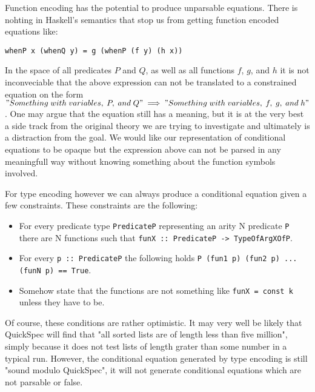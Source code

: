 Function encoding has the potential to produce unparsable equations.
There is nohting in Haskell's semantics that stop us from getting function
encoded equations like:
\begin{verbatim}whenP x (whenQ y) = g (whenP (f y) (h x))\end{verbatim}
In the space of all predicates $P$ and $Q$, as well as all functions $f$, $g$, and $h$ it
is not inconveciable that the above expression can not be translated to a constrained
equation on the form\\$"Something\;with\;variables,\;P,\;and\;Q"\implies "Something\;with\;variables,\;f,\;g,\;and\;h"$.
One may argue that the equation still has a meaning, but it is at the very best a side track
from the original theory we are trying to investigate and ultimately is a distraction from the goal.
We would like our representation of conditional equations to be opaque but the expression above
can not be parsed in any meaningfull way without knowing something about the function symbols involved.

For type encoding however we can always produce a conditional equation given a few constraints.
These constraints are the following:
\begin{itemize}
    \item For every predicate type \texttt{PredicateP} representing an arity N predicate \texttt{P}
        there are N functions such that \texttt{funX :: PredicateP -> TypeOfArgXOfP}.
    \item For every \texttt{p :: PredicateP} the following holds \texttt{P (fun1 p) (fun2 p) ... (funN p) == True}.
    \item Somehow state that the functions are not something like \texttt{funX = const k} unless they have to be.
\end{itemize}
Of course, these conditions are rather optimistic. It may very well be likely that QuickSpec will find that "all sorted lists
are of length less than five million", simply because it does not test lists of length grater than some number in a typical
run. However, the conditional equation generated by type encoding is still "sound modulo QuickSpec", it will not generate
conditional equations which are not parsable or false. %
